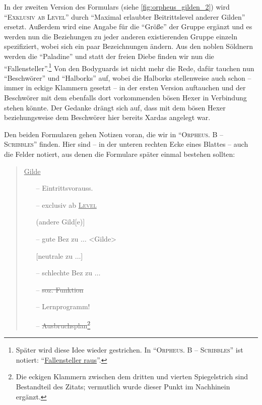 \documentclass[a5paper,pagesize,numbers=noenddot]{scrbook}
\begin{document}
In der zweiten Version des Formulars (siehe \autoref{fig:orpheus_gilden_2}) wird \enquote{\textsc{Exklusiv ab Level}} durch \enquote{Maximal erlaubter Beitrittslevel anderer Gilden} ersetzt.
Außerdem wird eine Angabe für die \enquote{Größe} der Gruppe ergänzt und es werden nun die Beziehungen zu jeder anderen existierenden Gruppe einzeln spezifiziert, wobei sich ein paar Bezeichnungen ändern.
Aus den noblen Söldnern werden die \enquote{Paladine} und statt der freien Diebe finden wir nun die \enquote{Fallensteller}.\footnote{Später wird diese Idee wieder gestrichen.
In \enquote{\textsc{Orpheus. B -- Scribbles}} ist notiert:
\enquote{\uline{Fallensteller raus}}.}
Von den Bodyguards ist nicht mehr die Rede, dafür tauchen nun \enquote{Beschwörer} und \enquote{Halborks} auf, wobei die Halborks stellenweise auch schon -- immer in eckige Klammern gesetzt -- in der ersten Version auftauchen und der Beschwörer mit dem ebenfalls dort vorkommenden bösen Hexer in Verbindung stehen könnte.
Der Gedanke drängt sich auf, dass mit dem bösen Hexer beziehungsweise dem Beschwörer hier bereits Xardas angelegt war.

Den beiden Formularen gehen Notizen voran, die wir in \enquote{\textsc{Orpheus. B -- Scribbles}} finden.\autocite[Vgl.][S.~13--15]{orpheus_b_scribbles}
Hier sind -- in der unteren rechten Ecke eines Blattes -- auch die Felder notiert, aus denen die Formulare später einmal bestehen sollten:

\begin{quote}
   \uline{Gilde}
   \begin{itemize}
      \item[--] Eintrittsvorauss.
      \item[--] exclusiv ab \textsc{\uline{Level}}
      \item[] \phantom{exclusiv ab} (andere Gild[e)]
      \item[--] gute Bez zu $\ldots$ <Gilde>
      \item[] [neutrale zu $\ldots$]
      \item[--] schlechte Bez zu $\ldots$
      \item[--] \sout{soz. Funktion}
      \item[--] Lernprogramm!
      \item[--] \sout{Ausbruchsplan}\footnote{Die eckigen Klammern zwischen dem dritten und vierten Spiegelstrich sind Bestandteil des Zitats; vermutlich wurde dieser Punkt im Nachhinein ergänzt.}
   \end{itemize}
\end{quote}
\end{document}
